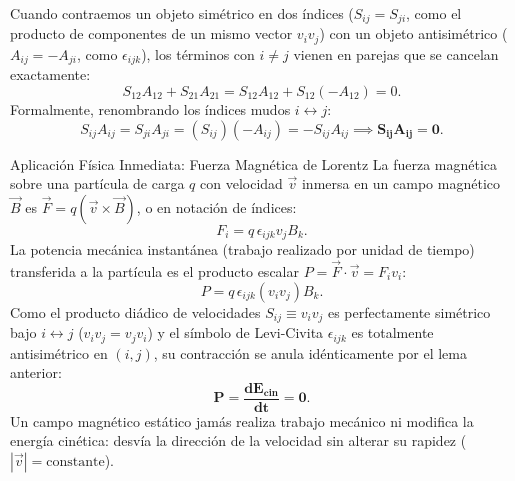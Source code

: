 \documentclass[11pt,letterpaper]{article}
\begin{document}
Cuando contraemos un objeto simétrico en dos índices ($S_{ij} = S_{ji}$, como el producto de componentes de un mismo vector $v_i v_j$) con un objeto antisimétrico ($A_{ij} = -A_{ji}$, como $\epsilon_{ijk}$), los términos con $i \neq j$ vienen en parejas que se cancelan exactamente:
\[
S_{12} A_{12} + S_{21} A_{21} = S_{12} A_{12} + S_{12}(-A_{12}) = 0.
\]
Formalmente, renombrando los índices mudos $i \leftrightarrow j$:
\[
S_{ij} A_{ij} = S_{ji} A_{ji} = (S_{ij})(-A_{ij}) = -S_{ij} A_{ij} \implies \mathbf{S_{ij} A_{ij} = 0}.
\]

\begin{examplebox}{Aplicación Física Inmediata: Fuerza Magnética de Lorentz}
La fuerza magnética sobre una partícula de carga $q$ con velocidad $\vec{v}$ inmersa en un campo magnético $\vec{B}$ es $\vec{F} = q(\vec{v} \times \vec{B})$, o en notación de índices:
\[
F_i = q\,\epsilon_{ijk} v_j B_k.
\]
La potencia mecánica instantánea (trabajo realizado por unidad de tiempo) transferida a la partícula es el producto escalar $P = \vec{F}\cdot\vec{v} = F_i v_i$:
\[
P = q\,\epsilon_{ijk} (v_i v_j) B_k.
\]
Como el producto diádico de velocidades $S_{ij} \equiv v_i v_j$ es perfectamente simétrico bajo $i \leftrightarrow j$ ($v_i v_j = v_j v_i$) y el símbolo de Levi-Civita $\epsilon_{ijk}$ es totalmente antisimétrico en $(i, j)$, su contracción se anula idénticamente por el lema anterior:
\[
\mathbf{P = \frac{dE_{\text{cin}}}{dt} = 0}.
\]
Un campo magnético estático jamás realiza trabajo mecánico ni modifica la energía cinética: desvía la dirección de la velocidad sin alterar su rapidez ($|\vec{v}| = \text{constante}$).

\begin{center}
\end{center}
\end{examplebox}
\end{document}
